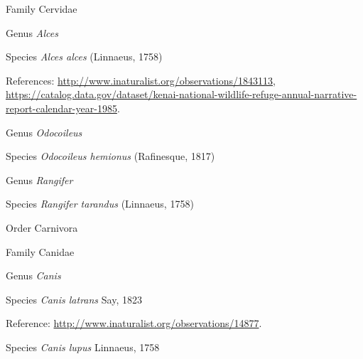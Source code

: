 \documentclass[9pt, article]{memoir}
\begin{document}
\begin{multicols}{2}
\vspace{6pt}\noindent\hspace{24pt}Family Cervidae


\vspace{6pt}\noindent\hspace{30pt}Genus \textit{Alces}


\vspace{6pt}\noindent\hspace{36pt}Species \textit{Alces alces} (Linnaeus, 1758)


\vspace{6pt}References: 
\url{http://www.inaturalist.org/observations/1843113}, 
\url{https://catalog.data.gov/dataset/kenai-national-wildlife-refuge-annual-narrative-report-calendar-year-1985}.

\vspace{6pt}\noindent\hspace{30pt}Genus \textit{Odocoileus}


\vspace{6pt}\noindent\hspace{36pt}Species \textit{Odocoileus hemionus} (Rafinesque, 1817)


\vspace{6pt}\noindent\hspace{30pt}Genus \textit{Rangifer}


\vspace{6pt}\noindent\hspace{36pt}Species \textit{Rangifer tarandus} (Linnaeus, 1758)


\vspace{6pt}\noindent\hspace{18pt}Order Carnivora


\vspace{6pt}\noindent\hspace{24pt}Family Canidae


\vspace{6pt}\noindent\hspace{30pt}Genus \textit{Canis}


\vspace{6pt}\noindent\hspace{36pt}Species \textit{Canis latrans} Say, 1823


\vspace{6pt}Reference: 
\url{http://www.inaturalist.org/observations/14877}.

\vspace{6pt}\noindent\hspace{36pt}Species \textit{Canis lupus} Linnaeus, 1758



\end{multicols}
\end{document}
